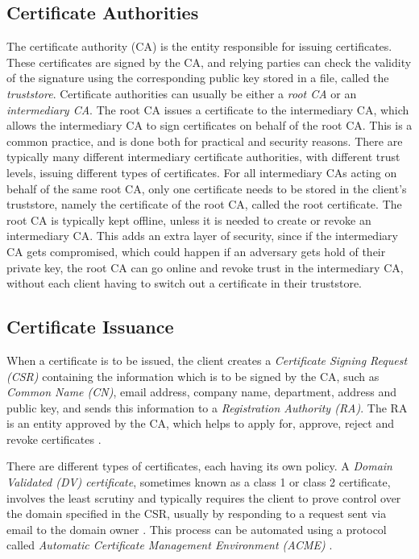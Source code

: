 \documentclass{style/kththesis}
\begin{document}
\subsection{Certificate Authorities}
The certificate authority (CA) is the entity responsible for issuing certificates. These certificates are signed by the CA, and relying parties can check the validity of the signature using the corresponding public key stored in a file, called the \emph{truststore}. Certificate authorities can usually be either a \emph{root CA} or an \emph{intermediary CA}. The root CA issues a certificate to the intermediary CA, which allows the intermediary CA to sign certificates on behalf of the root CA. This is a common practice, and is done both for practical and security reasons. There are typically many different intermediary certificate authorities, with different trust levels, issuing different types of certificates. For all intermediary CAs acting on behalf of the same root CA, only one certificate needs to be stored in the client's truststore, namely the certificate of the root CA, called the root certificate. The root CA is typically kept offline, unless it is needed to create or revoke an intermediary CA. This adds an extra layer of security, since if the intermediary CA gets compromised, which could happen if an adversary gets hold of their private key, the root CA can go online and revoke trust in the intermediary CA, without each client having to switch out a certificate in their truststore.

\subsection{Certificate Issuance}
When a certificate is to be issued, the client creates a \emph{Certificate Signing Request (CSR)} containing the information which is to be signed by the CA, such as \textit{Common Name (CN)}, email address, company name, department, address and public key, and sends this information to a \emph{Registration Authority (RA)}. The RA is an entity approved by the CA, which helps to apply for, approve, reject and revoke certificates \cite{Ford00}. 

There are different types of certificates, each having its own policy. A \emph{Domain Validated (DV) certificate}, sometimes known as a class 1 or class 2 certificate, involves the least scrutiny and typically requires the client to prove control over the domain specified in the CSR, usually by responding to a request sent via email to the domain owner \cite{Ford00}. This process can be automated using a protocol called \emph{Automatic Certificate Management Environment (ACME)} \cite{Barnes16}.
\end{document}
